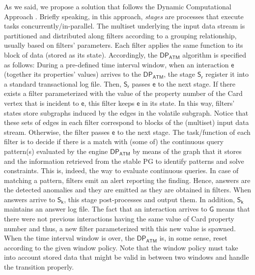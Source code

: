 As we said, we propose a solution that follows the Dynamic Computational Approach \cite{DP-pasarella2024computational}. Briefly speaking, in this approach, \emph{stages} are processes that execute tasks concurrently/in-parallel. The multiset underlying the input data stream is partitioned \cite{bender1974partitions} and distributed along filters according to a grouping relationship, usually based on filters' parameters. Each filter applies the same function to its block of data (stored as its state). Accordingly, the  $\mathsf{DP_{ATM}}$ algorithm is specified as follows: During a pre-defined time interval window, when an \textsf{interaction} $\mathsf{e}$ (together its properties' values)  arrives to the $\mathsf{DP_{ATM}}$, the stage $\mathsf{S_r}$ register it into a standard transactional log file. Then, $\mathsf{S_r}$ passes $\mathsf{e}$ to the next stage. If there exists a filter parameterized with the value of the property \textsf{number} of the Card vertex that is incident to  $\mathsf{e}$, this filter keeps $\mathsf{e}$ in its state. In this way, filters' states store  subgraphs induced by the edges in the volatile subgraph. Notice that these sets of edges in each filter correspond to blocks of the (multiset) input data stream.  Otherwise, the filter passes $\mathsf{e}$ to the next stage. The task/function of each filter is to decide if there is a match with (some of) the continuous query pattern(s) evaluated by the engine $\mathsf{DP_{ATM}}$ by means of the graph that it stores and the information retrieved from the stable PG to identify patterns and solve constraints. This is, indeed, the way to evaluate continuous queries. In case of matching a pattern, filters emit an alert reporting the finding. Hence, answers are the detected anomalies and they are emitted as they are obtained in filters. When answers arrive to $\mathsf{S_k}$, this stage  post-processes  and output  them. In addition, $\mathsf{S_k}$ maintains an answer log file. The fact that an \textsf{interaction} arrives to $\mathsf{G}$ means that there were not previous interactions having the same value of Card property \textsf{number} and thus, a new filter parameterized with this new value is spawned. When the time interval window is over, the $\mathsf{DP_{ATM}}$ is, in some sense, reset according to the given window policy. Note that the window policy must take into account stored data that might be valid in between two windows and handle the transition properly.
%
